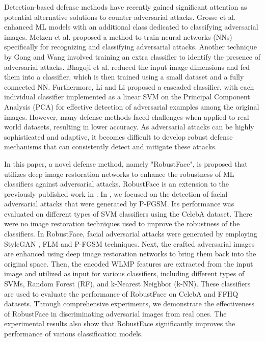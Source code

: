 \documentclass[sn-mathphys]{sn-jnl}%
\theoremstyle{thmstyleone}%
\theoremstyle{thmstyletwo}%
\theoremstyle{thmstylethree}%
\begin{document}
Detection-based defense methods have recently gained significant attention as potential alternative solutions to counter adversarial attacks. Grosse et al. \cite{grosse2017statistical} enhanced ML models with an additional class dedicated to classifying adversarial images. Metzen et al. \cite{metzen2017detecting} proposed a method to train neural networks (NNs) specifically for recognizing and classifying adversarial attacks. Another technique by Gong and Wang \cite{gong2017adversarial} involved training an extra classifier to identify the presence of adversarial attacks. Bhagoji et al. \cite{bhagoji2017dimensionality} reduced the input image dimensions and fed them into a classifier, which is then trained using a small dataset and a fully connected NN. Furthermore, Li and Li \cite{li2017adversarial} proposed a cascaded classifier, with each individual classifier implemented as a linear SVM on the Principal Component Analysis (PCA) for effective detection of adversarial examples among the original images. However, many defense methods faced challenges when applied to real-world datasets, resulting in lower accuracy. As adversarial attacks can be highly sophisticated and adaptive, it becomes difficult to develop robust defense mechanisms that can consistently detect and mitigate these attacks. 

In this paper, a novel defense method, namely "RobustFace", is proposed that utilizes deep image restoration networks to enhance the robustness of ML classifiers against adversarial attacks. RobustFace is an extension to the previously published work in \cite{sadu2021defense}. In \cite{sadu2021defense}, we focused on the detection of facial adversarial attacks that were generated by P-FGSM. Its performance was evaluated on different types of SVM classifiers using the CelebA dataset. There were no image restoration techniques used to improve the robustness of the classifiers. In RobustFace, facial adversarial attacks were generated by employing StyleGAN \cite{karras2019style}, FLM \cite{dabouei2019fast} and P-FGSM \cite{li2019scene} techniques. Next, the crafted adversarial images are enhanced using deep image restoration networks to bring them back into the original space. Then, the encoded WLMP features are extracted from the input image and utilized as input for various classifiers, including different types of SVMs, Random Forest (RF), and k-Nearest Neighbor (k-NN). These classifiers are used to evaluate the performance of RobustFace on CelebA and FFHQ datasets. Through comprehensive experiments, we demonstrate the effectiveness of RobustFace in discriminating adversarial images from real ones. The experimental results also show that RobustFace significantly improves the performance of various classification models.\\
\end{document}
